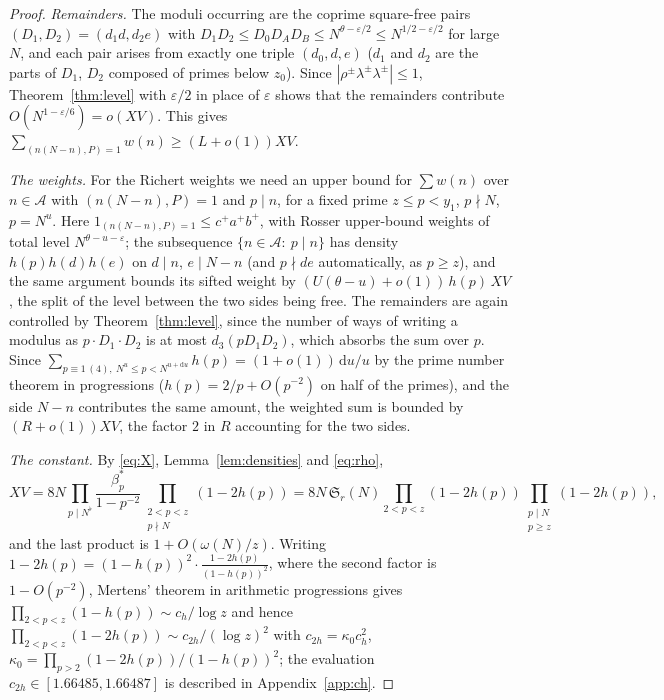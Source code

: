 \documentclass[11pt]{amsart}
\theoremstyle{remark}
\newcommand{\cA}{\mathcal{A}}
\newcommand{\Sg}{\mathfrak{S}}
\newcommand{\e}{\varepsilon}
\newcommand{\dd}{\mathrm{d}}
\begin{document}
\begin{proof}
\emph{Remainders.} The moduli occurring are the coprime square-free pairs $(D_1,D_2)=(d_1d,d_2e)$ with $D_1D_2\le D_0D_AD_B\le N^{\theta-\e/2}\le N^{1/2-\e/2}$ for large $N$, and each pair arises from exactly one triple $(d_0,d,e)$ ($d_1$ and $d_2$ are the parts of $D_1$, $D_2$ composed of primes below $z_0$). Since $|\rho^\pm\lambda^\pm\lambda^\pm|\le1$, Theorem~\ref{thm:level} with $\e/2$ in place of $\e$ shows that the remainders contribute $O(N^{1-\e/6})=o(XV)$. This gives $\sum_{(n(N-n),P)=1}w(n)\ge(L+o(1))XV$.

\emph{The weights.} For the Richert weights we need an upper bound for $\sum w(n)$ over $n\in\cA$ with $(n(N-n),P)=1$ and $p\mid n$, for a fixed prime $z\le p<y_1$, $p\nmid N$, $p=N^u$. Here $1_{(n(N-n),P)=1}\le c^+a^+b^+$, with Rosser upper-bound weights of total level $N^{\theta-u-\e}$; the subsequence $\{n\in\cA:\ p\mid n\}$ has density $h(p)h(d)h(e)$ on $d\mid n$, $e\mid N-n$ (and $p\nmid de$ automatically, as $p\ge z$), and the same argument bounds its sifted weight by $(U(\theta-u)+o(1))\,h(p)\,XV$, the split of the level between the two sides being free. The remainders are again controlled by Theorem~\ref{thm:level}, since the number of ways of writing a modulus as $p\cdot D_1\cdot D_2$ is at most $d_3(pD_1D_2)$, which absorbs the sum over $p$. Since $\sum_{p\equiv1\,(4),\ N^u\le p<N^{u+\dd u}}h(p)=(1+o(1))\,\dd u/u$ by the prime number theorem in progressions ($h(p)=2/p+O(p^{-2})$ on half of the primes), and the side $N-n$ contributes the same amount, the weighted sum is bounded by $(R+o(1))XV$, the factor $2$ in $R$ accounting for the two sides.

\emph{The constant.} By \eqref{eq:X}, Lemma~\ref{lem:densities} and \eqref{eq:rho},
\[
XV=8N\prod_{p\mid N^\flat}\frac{\beta_p^*}{1-p^{-2}}\prod_{\substack{2<p<z\\ p\nmid N}}(1-2h(p))
=8N\,\Sg_r(N)\prod_{2<p<z}(1-2h(p))\prod_{\substack{p\mid N\\ p\ge z}}(1-2h(p)) ,
\]
and the last product is $1+O(\omega(N)/z)$. Writing $1-2h(p)=(1-h(p))^2\cdot\frac{1-2h(p)}{(1-h(p))^2}$, where the second factor is $1-O(p^{-2})$, Mertens' theorem in arithmetic progressions gives $\prod_{2<p<z}(1-h(p))\sim c_h/\log z$ and hence $\prod_{2<p<z}(1-2h(p))\sim c_{2h}/(\log z)^2$ with $c_{2h}=\kappa_0c_h^2$, $\kappa_0=\prod_{p>2}(1-2h(p))/(1-h(p))^2$; the evaluation $c_{2h}\in[1.66485,1.66487]$ is described in Appendix~\ref{app:ch}.
\end{proof}
\end{document}
